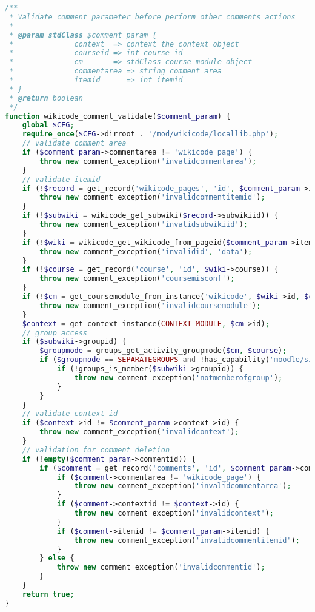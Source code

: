\begin{lstlisting}[language=PHP]
/**
 * Validate comment parameter before perform other comments actions
 *
 * @param stdClass $comment_param {
 *              context  => context the context object
 *              courseid => int course id
 *              cm       => stdClass course module object
 *              commentarea => string comment area
 *              itemid      => int itemid
 * }
 * @return boolean
 */
function wikicode_comment_validate($comment_param) {
    global $CFG;
    require_once($CFG->dirroot . '/mod/wikicode/locallib.php');
    // validate comment area
    if ($comment_param->commentarea != 'wikicode_page') {
        throw new comment_exception('invalidcommentarea');
    }
    // validate itemid
    if (!$record = get_record('wikicode_pages', 'id', $comment_param->itemid)) {
        throw new comment_exception('invalidcommentitemid');
    }
    if (!$subwiki = wikicode_get_subwiki($record->subwikiid)) {
        throw new comment_exception('invalidsubwikiid');
    }
    if (!$wiki = wikicode_get_wikicode_from_pageid($comment_param->itemid)) {
        throw new comment_exception('invalidid', 'data');
    }
    if (!$course = get_record('course', 'id', $wiki->course)) {
        throw new comment_exception('coursemisconf');
    }
    if (!$cm = get_coursemodule_from_instance('wikicode', $wiki->id, $course->id)) {
        throw new comment_exception('invalidcoursemodule');
    }
    $context = get_context_instance(CONTEXT_MODULE, $cm->id);
    // group access
    if ($subwiki->groupid) {
        $groupmode = groups_get_activity_groupmode($cm, $course);
        if ($groupmode == SEPARATEGROUPS and !has_capability('moodle/site:accessallgroups', $context)) {
            if (!groups_is_member($subwiki->groupid)) {
                throw new comment_exception('notmemberofgroup');
            }
        }
    }
    // validate context id
    if ($context->id != $comment_param->context->id) {
        throw new comment_exception('invalidcontext');
    }
    // validation for comment deletion
    if (!empty($comment_param->commentid)) {
        if ($comment = get_record('comments', 'id', $comment_param->commentid)) {
            if ($comment->commentarea != 'wikicode_page') {
                throw new comment_exception('invalidcommentarea');
            }
            if ($comment->contextid != $context->id) {
                throw new comment_exception('invalidcontext');
            }
            if ($comment->itemid != $comment_param->itemid) {
                throw new comment_exception('invalidcommentitemid');
            }
        } else {
            throw new comment_exception('invalidcommentid');
        }
    }
    return true;
}


\end{lstlisting}
